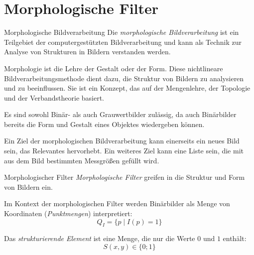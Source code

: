 \section{Morphologische Filter}

\begin{defi}{Morphologische Bildverarbeitung}
    Die \emph{morphologische Bildverarbeitung} ist ein Teilgebiet der computergestützten Bildverarbeitung und kann als Technik zur Analyse von Strukturen in Bildern verstanden werden.

    Morphologie ist die Lehre der Gestalt oder der Form.
    Diese nichtlineare Bildverarbeitungsmethode dient dazu, die Struktur von Bildern zu analysieren und zu beeinflussen.
    Sie ist ein Konzept, das auf der Mengenlehre, der Topologie und der Verbandstheorie basiert.

    Es sind sowohl Binär- als auch Grauwertbilder zulässig, da auch Binärbilder bereits die Form und Gestalt eines Objektes wiedergeben können.

    Ein Ziel der morphologischen Bildverarbeitung kann einerseits ein neues Bild sein, das Relevantes hervorhebt.
    Ein weiteres Ziel kann eine Liste sein, die mit aus dem Bild bestimmten Messgrößen gefüllt wird.
\end{defi}

\begin{defi}{Morphologischer Filter}
    \emph{Morphologische Filter} greifen in die Struktur und Form von Bildern ein.

    Im Kontext der morphologischen Filter werden Binärbilder als Menge von Koordinaten (\emph{Punktmengen}) interpretiert:
    \[
        Q_I = \{ p \mid I(p) = 1 \}
    \]

    Das \emph{strukturierende Element} ist eine Menge, die nur die Werte $0$ und $1$ enthält:
    \[
        S(x, y) \in \{ 0; 1 \}
    \]

\end{defi}

